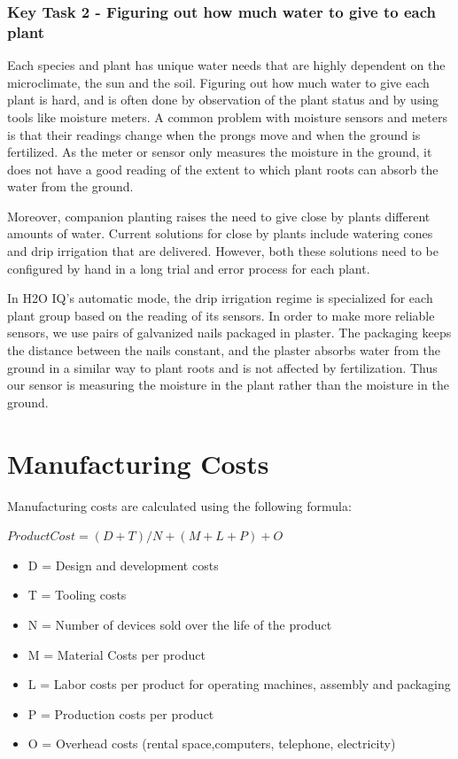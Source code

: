 \documentclass[11pt]{article}
\begin{document}
\subsubsection{Key Task 2 - Figuring out how much water to give to each plant}

Each species and plant has unique water needs that are highly dependent on the microclimate, the sun and the soil. Figuring out how much water to give each plant is hard, and is often done by observation of the plant status and by using tools like moisture meters. A common problem with moisture sensors and meters is that their readings change when the prongs move and when the ground is fertilized. As the meter or sensor only measures the moisture in the ground, it does not have a good reading of the extent to which plant roots can absorb the water from the ground.

Moreover, companion planting raises the need to give close by plants different amounts of water. Current solutions for close by plants include watering cones and drip irrigation that are delivered. However, both these solutions need to be configured by hand in a long trial and error process for each plant.

In H2O IQ's automatic mode, the drip irrigation regime is specialized for each plant group based on the reading of its sensors. In order to make more reliable sensors, we use pairs of galvanized nails packaged in plaster. The packaging keeps the distance between the nails constant, and the plaster absorbs water from the ground in a similar way to plant roots and is not affected by fertilization. Thus our sensor is measuring the moisture in the plant rather than the moisture in the ground.

\section{Manufacturing Costs}

Manufacturing costs are calculated using the following formula:

$Product Cost = (D + T)/N + (M + L + P) + O$

\begin{itemize}
\item D = Design and development costs
\item T = Tooling costs
\item N = Number of devices sold over the life of the product
\item M = Material Costs per product
\item L = Labor costs per product for operating machines, assembly and packaging
\item P = Production costs per product
\item O = Overhead costs (rental space,computers, telephone, electricity)
\end{itemize} 
\end{document}
